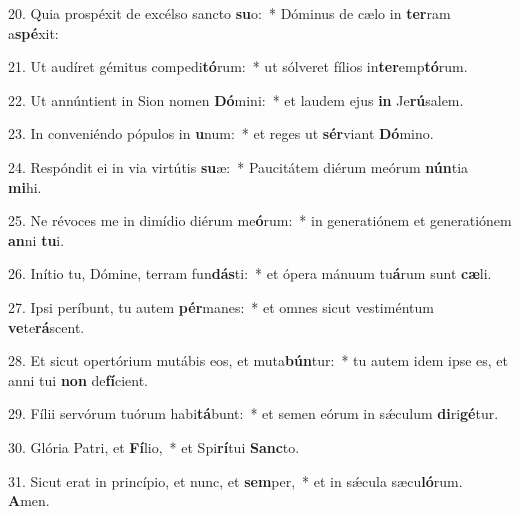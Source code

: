 20. Quia prospéxit de excélso sancto \textbf{su}o:~*  Dóminus de cælo in \textbf{ter}ram a\textbf{spé}xit:\

21. Ut audíret gémitus compedi\textbf{tó}rum:~*  ut sólveret fílios in\textbf{ter}emp\textbf{tó}rum.\

22. Ut annúntient in Sion nomen \textbf{Dó}mini:~*  et laudem ejus \textbf{in} Je\textbf{rú}salem.\

23. In conveniéndo pópulos in \textbf{u}num:~*  et reges ut \textbf{sér}viant \textbf{Dó}mino.\

24. Respóndit ei in via virtútis \textbf{su}æ:~*  Paucitátem diérum meórum \textbf{nún}tia \textbf{mi}hi.\

25. Ne révoces me in dimídio diérum me\textbf{ó}rum:~*  in generatiónem et generatiónem \textbf{an}ni \textbf{tu}i.\

26. Inítio tu, Dómine, terram fun\textbf{dás}ti:~*  et ópera mánuum tu\textbf{á}rum sunt \textbf{cæ}li.\

27. Ipsi períbunt, tu autem \textbf{pér}manes:~*  et omnes sicut vestiméntum \textbf{ve}te\textbf{rá}scent.\

28. Et sicut opertórium mutábis eos, et muta\textbf{bún}tur:~*  tu autem idem ipse es, et anni tui \textbf{non} de\textbf{fí}cient.\

29. Fílii servórum tuórum habi\textbf{tá}bunt:~*  et semen eórum in sǽculum \textbf{di}ri\textbf{gé}tur.\

30. Glória Patri, et \textbf{Fí}lio,~*  et Spi\textbf{rí}tui \textbf{Sanc}to.\

31. Sicut erat in princípio, et nunc, et \textbf{sem}per,~*  et in sǽcula sæcu\textbf{ló}rum. \textbf{A}men.\

